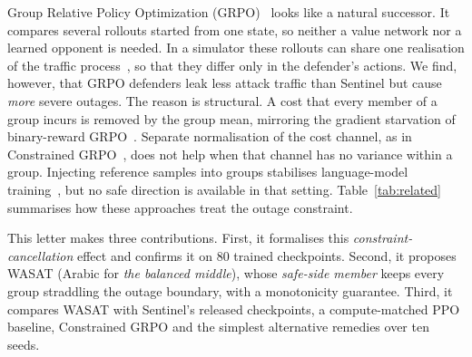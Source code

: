 \documentclass[journal]{IEEEtran}
\begin{document}
Group Relative Policy Optimization (GRPO)~\cite{shao2024deepseekmath} looks like a natural successor. It compares several rollouts started from one state, so neither a value network nor a learned opponent is needed. In a simulator these rollouts can share one realisation of the traffic process~\cite{ng2000pegasus}, so that they differ only in the defender's actions. We find, however, that GRPO defenders leak less attack traffic than Sentinel but cause \emph{more} severe outages. The reason is structural. A cost that every member of a group incurs is removed by the group mean, mirroring the gradient starvation of binary-reward GRPO~\cite{nie2026starvation,yu2025dapo}. Separate normalisation of the cost channel, as in Constrained GRPO~\cite{girgis2026cgrpo}, does not help when that channel has no variance within a group. Injecting reference samples into groups stabilises language-model training~\cite{yan2025luffy,armor2026}, but no safe direction is available in that setting. Table~\ref{tab:related} summarises how these approaches treat the outage constraint.

\begin{table}[t]
\centering
\caption{Treatment of the Outage Constraint by Related Approaches}
\label{tab:related}
\setlength{\tabcolsep}{2.5pt}
\end{table}

This letter makes three contributions. First, it formalises this \emph{constraint-cancellation} effect and confirms it on 80 trained checkpoints. Second, it proposes WASAT (Arabic for \emph{the balanced middle}), whose \emph{safe-side member} keeps every group straddling the outage boundary, with a monotonicity guarantee. Third, it compares WASAT with Sentinel's released checkpoints, a compute-matched PPO baseline, Constrained GRPO and the simplest alternative remedies over ten seeds.
\end{document}
